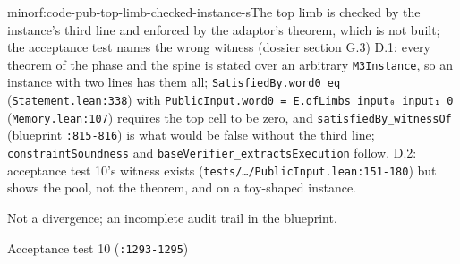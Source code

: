 \begin{finding}{minor}{f:code-pub-top-limb-checked-instance-s}{The top limb is checked by the instance's third line and enforced by the adaptor's theorem, which is not built; the acceptance test names the wrong witness (dossier section G.3)}
D.1: every theorem of the phase and the spine is stated over an arbitrary \texttt{M3Instance}, so an instance with two lines has them all; \texttt{SatisfiedBy.\allowbreak{}word0\_\allowbreak{}eq} (\texttt{Statement.\allowbreak{}lean:338}) with \texttt{P\allowbreak{}u\allowbreak{}b\allowbreak{}l\allowbreak{}i\allowbreak{}c\allowbreak{}I\allowbreak{}n\allowbreak{}p\allowbreak{}u\allowbreak{}t\allowbreak{}.\allowbreak{}w\allowbreak{}o\allowbreak{}r\allowbreak{}d\allowbreak{}0\allowbreak{} =\allowbreak{} E\allowbreak{}.\allowbreak{}o\allowbreak{}f\allowbreak{}L\allowbreak{}i\allowbreak{}m\allowbreak{}b\allowbreak{}s\allowbreak{} i\allowbreak{}n\allowbreak{}p\allowbreak{}u\allowbreak{}t\allowbreak{}₀\allowbreak{} i\allowbreak{}n\allowbreak{}p\allowbreak{}u\allowbreak{}t\allowbreak{}₁\allowbreak{} 0} (\texttt{Memory.\allowbreak{}lean:107}) requires the top cell to be zero, and \texttt{satisfiedBy\_\allowbreak{}witnessOf} (blueprint \texttt{:815-{}816}) is what would be false without the third line; \texttt{constraintSoundness} and \texttt{b\allowbreak{}a\allowbreak{}s\allowbreak{}e\allowbreak{}V\allowbreak{}e\allowbreak{}r\allowbreak{}i\allowbreak{}f\allowbreak{}i\allowbreak{}e\allowbreak{}r\allowbreak{}\_\allowbreak{}e\allowbreak{}x\allowbreak{}t\allowbreak{}r\allowbreak{}a\allowbreak{}c\allowbreak{}t\allowbreak{}s\allowbreak{}E\allowbreak{}x\allowbreak{}e\allowbreak{}c\allowbreak{}u\allowbreak{}t\allowbreak{}i\allowbreak{}o\allowbreak{}n} follow. D.2: acceptance test 10's witness exists (\texttt{t\allowbreak{}e\allowbreak{}s\allowbreak{}t\allowbreak{}s\allowbreak{}/\allowbreak{}…\allowbreak{}/\allowbreak{}P\allowbreak{}u\allowbreak{}b\allowbreak{}l\allowbreak{}i\allowbreak{}c\allowbreak{}I\allowbreak{}n\allowbreak{}p\allowbreak{}u\allowbreak{}t\allowbreak{}.\allowbreak{}l\allowbreak{}e\allowbreak{}a\allowbreak{}n\allowbreak{}:\allowbreak{}1\allowbreak{}5\allowbreak{}1\allowbreak{}-{}\allowbreak{}1\allowbreak{}8\allowbreak{}0}) but shows the pool, not the theorem, and on a toy-shaped instance.

Not a divergence; an incomplete audit trail in the blueprint.

Acceptance test 10 (\texttt{:1293-{}1295})


\end{finding}
